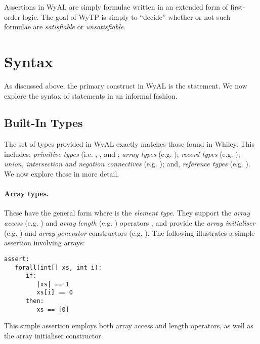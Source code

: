 Assertions in WyAL are simply formulae written in an extended form of
first-order logic.  The goal of WyTP is simply to ``decide'' whether
or not such formulae are {\em satisfiable} or {\em unsatisfiable}.  


\section{Syntax}
As discussed above, the primary construct in WyAL is the
 statement.  We now explore the syntax of
 statements in an informal fashion.


\subsection{Built-In Types}

The set of types provided in WyAL exactly matches those found in
Whiley.  This includes: {\em primitive types} (i.e. ,
,  and ; {\em array
    types} (e.g. ); {\em record types}
  (e.g. ); {\em union, intersection and
    negation connectives} (e.g. ); and,
  {\em reference types} (e.g. ).  We now explore these
  in more detail.

  \paragraph{Array types.} These have the general form 
  where  is the {\em element type}.  They support the
  {\em array access} (e.g. ) and {\em array length}
  (e.g. ) operators , and provide the {\em array
    initialiser} (e.g. \clstinline{[1,2,3]}) and {\em array generator}
  constructors (e.g. \clstinline{[0;n]}).  The following illustrates a
  simple assertion involving arrays:

\begin{tcolorbox}\begin{lstlisting}[language=WyAL]
assert:
   forall(int[] xs, int i):
      if:
         |xs| == 1
         xs[i] == 0
      then:
         xs == [0]
\end{lstlisting}\end{tcolorbox}

This simple assertion employs both array access and length operators,
as well as the array initialiser constructor.

